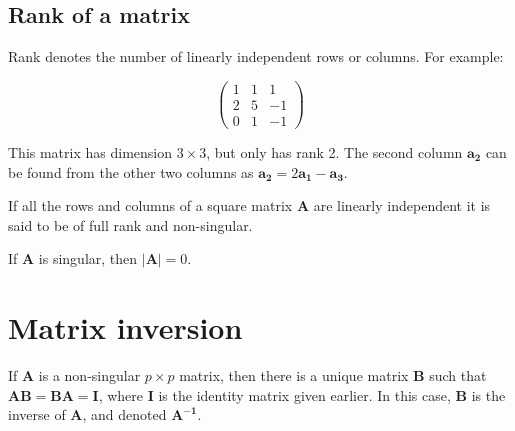 


\subsection{Rank of a matrix}

Rank denotes the number of linearly independent rows or columns.   For example:

\begin{displaymath}  
\left( \begin{array}{rrr} 1 & 1 & 1 \\ 2 & 5 & -1 \\ 0 & 1 & -1 \end{array} \right)
\end{displaymath}

This matrix has dimension $3 \times 3$, but only has rank 2.   The second column $\boldsymbol{a_{2}}$ can be found from the other two columns as   $\boldsymbol{a_{2}}= 2 \boldsymbol{a_{1}} - \boldsymbol{a_{3}}$.

If all the rows and columns of a square matrix \textbf{A} are linearly independent it is said to be of full rank and non-singular.

If \textbf{A} is singular, then $\lvert \boldsymbol{A} \rvert = 0$.



\section{Matrix inversion}

If \textbf{A} is a non-singular $p \times p$ matrix, then there is a unique matrix \textbf{B} such that $\boldsymbol{A B} = \boldsymbol{B A} = \boldsymbol{I}$, where \textbf{I} is the identity matrix given earlier.   In this case, \textbf{B} is the inverse of \textbf{A}, and denoted $\boldsymbol{A^{-1}}$.


